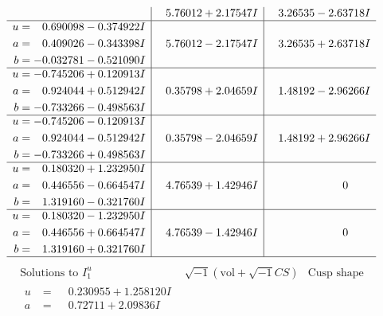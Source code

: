 \documentclass[1p]{elsarticle_modified}
\theoremstyle{definition}
\newcommand{\I}{\sqrt{-1}}
\begin{document}
$$\begin{array}{c|c|c}
 & \phantom{-}5.76012 + 2.17547 I & \phantom{-}3.26535 - 2.63718 I \\ \hline\begin{aligned}
u &= \phantom{-}0.690098 - 0.374922 I \\
a &= \phantom{-}0.409026 - 0.343398 I \\
b &= -0.032781 - 0.521090 I\end{aligned}
 & \phantom{-}5.76012 - 2.17547 I & \phantom{-}3.26535 + 2.63718 I \\ \hline\begin{aligned}
u &= -0.745206 + 0.120913 I \\
a &= \phantom{-}0.924044 + 0.512942 I \\
b &= -0.733266 - 0.498563 I\end{aligned}
 & \phantom{-}0.35798 + 2.04659 I & \phantom{-}1.48192 - 2.96266 I \\ \hline\begin{aligned}
u &= -0.745206 - 0.120913 I \\
a &= \phantom{-}0.924044 - 0.512942 I \\
b &= -0.733266 + 0.498563 I\end{aligned}
 & \phantom{-}0.35798 - 2.04659 I & \phantom{-}1.48192 + 2.96266 I \\ \hline\begin{aligned}
u &= \phantom{-}0.180320 + 1.232950 I \\
a &= \phantom{-}0.446556 - 0.664547 I \\
b &= \phantom{-}1.319160 - 0.321760 I\end{aligned}
 & \phantom{-}4.76539 + 1.42946 I & \phantom{-0.000000 } 0 \\ \hline\begin{aligned}
u &= \phantom{-}0.180320 - 1.232950 I \\
a &= \phantom{-}0.446556 + 0.664547 I \\
b &= \phantom{-}1.319160 + 0.321760 I\end{aligned}
 & \phantom{-}4.76539 - 1.42946 I & \phantom{-0.000000 } 0\\
 \hline 
 \end{array}$$\newpage$$\begin{array}{c|c|c}  
\text{Solutions to }I^u_{1}& \I (\text{vol} + \sqrt{-1}CS) & \text{Cusp shape}\\
 \hline 
\begin{aligned}
u &= \phantom{-}0.230955 + 1.258120 I \\
a &= \phantom{-}0.72711 + 2.09836 I \\

\end{aligned}
\end{array}$$
\end{document}
